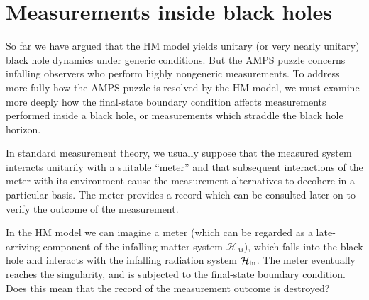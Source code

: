 \documentclass[11pt]{article}
\begin{document}

\section{Measurements inside black holes}
\label{sec:measurements}

So far we have argued that the HM model yields unitary (or very nearly unitary) black hole dynamics under generic conditions. But the AMPS puzzle concerns infalling observers who perform highly nongeneric measurements. To address more fully how the AMPS puzzle is resolved by the HM model, we must examine more deeply how the final-state boundary condition affects measurements performed inside a black hole, or measurements which straddle the black hole horizon. 

In standard measurement theory, we usually suppose that the measured system interacts unitarily with a suitable ``meter'' and that subsequent interactions of the meter with its environment cause the measurement alternatives to decohere in a particular basis. The meter provides a record which can be consulted later on to verify the outcome of the measurement. 

In the HM model we can imagine a meter (which can be regarded as a late-arriving component of the infalling matter system $\mathcal{H}_M$), which falls into the black hole and interacts with the infalling radiation system $\mathcal{H}_{\rm in}$. The meter eventually reaches the singularity, and is subjected to the final-state boundary condition. Does this mean that the record of the measurement outcome is destroyed?
\end{document}
